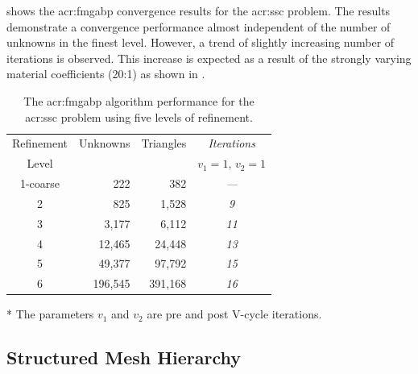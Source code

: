  shows the \gls{acr:fmgabp} convergence results for the \gls{acr:ssc} problem.
The results demonstrate a convergence performance almost independent of the number of unknowns in the finest level.
However, a trend of slightly increasing number of iterations is observed.
This increase is expected as a result of the strongly varying material coefficients (20:1) as shown in .

\begin{table}
	\centering
	\begin{threeparttable}[c]
		\caption[The \acrshort{acr:fmgabp} algorithm performance for the \acrshort{acr:ssc} problem.]{The \acrshort{acr:fmgabp} algorithm performance for the \acrshort{acr:ssc} problem using five levels of refinement.} \label{tbl:sscItr}
		\begin{tabular}{crr>{\itshape}c} \toprule
			Refinement & Unknowns & Triangles & Iterations           \tabularnewline
			Level      &          &           & $v_{1}=1,\, v_{2}=1$ \tnote{*} \tabularnewline
			\midrule
			1-coarse   & 222      & 382       & ---  \tabularnewline
			2          & 825      & 1,528     & 9    \tabularnewline
			3          & 3,177    & 6,112     & 11   \tabularnewline
			4          & 12,465   & 24,448    & 13   \tabularnewline
			5          & 49,377   & 97,792    & 15   \tabularnewline
			6          & 196,545  & 391,168   & 16   \tabularnewline
			\bottomrule
		\end{tabular}
		\begin{tablenotes}
			\begin{footnotesize}
			\item[*] {The parameters $v_{1}$ and $v_{2}$ are pre and post V-cycle iterations.}
			\end{footnotesize}
		\end{tablenotes}
	\end{threeparttable}
\end{table}


\subsection{Structured Mesh Hierarchy}

